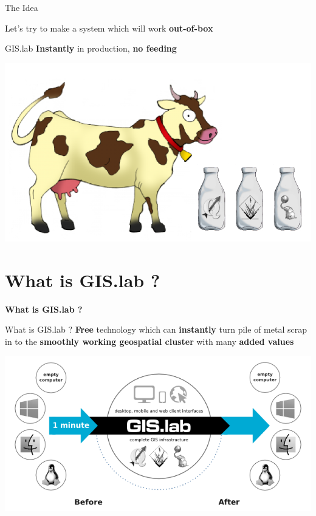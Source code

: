\documentclass[12pt]{beamer}
\begin{document}
\begin{frame}{The Idea}
	\begin{center}
		Let's try to make a system which will work \textbf{out-of-box}
	\end{center}
\end{frame}

\begin{frame}{GIS.lab}
	\textbf{Instantly} in production, \textbf{no feeding}
	\begin{center}
		\includegraphics[keepaspectratio=true,height=0.6\textheight]{images/cow-geospatial.png}
	\end{center}
\end{frame}


\section{What is GIS.lab ?}
\begin{frame}
	\begin{center}
		\LARGE\textbf{What is GIS.lab ?}
	\end{center}
\end{frame}

\begin{frame}{What is GIS.lab ?}
	\textbf{Free} technology which can \textbf{instantly} turn pile of metal scrap in to the \textbf{smoothly working geospatial cluster} with many \textbf{added values}
	\begin{center}
		\includegraphics[keepaspectratio=true,height=0.5\textheight]{images/gislab-schema.png}
	\end{center}
\end{frame}
\end{document}
